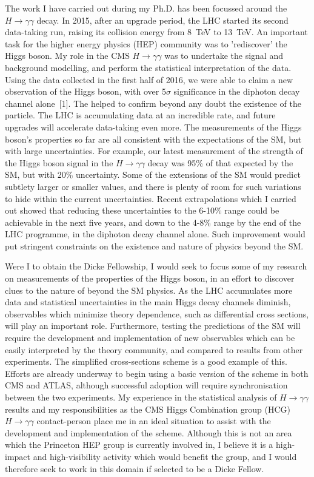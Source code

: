 \documentclass[11pt,a4paper,sans]{moderncv}        %
\begin{document}
The work I have carried out during my Ph.D. has been focussed around the $H \rightarrow \gamma \gamma$ decay. In 2015, after an upgrade period, the LHC started its second data-taking run, raising its collision energy from 8~TeV to 13~TeV. An important task for the higher energy physics (HEP) community was to 'rediscover' the Higgs boson. My role in the CMS $H \rightarrow \gamma \gamma$ was to undertake the signal and background modelling, and perform the statistical interpretation of the data. Using the data collected in the first half of 2016, we were able to claim a new observation of the Higgs boson, with over 5$\sigma$ significance in the diphoton decay channel alone~[1]. The helped to confirm beyond any doubt the existence of the particle. The LHC is accumulating data at an incredible rate, and future upgrades will accelerate data-taking even more. The measurements of the Higgs boson's properties so far are all consistent with the expectations of the SM, but with large uncertainties. For example, our latest measurement of the strength of the Higgs boson signal in the $H \rightarrow \gamma \gamma$ decay was 95\% of that expected by the SM, but with 20\% uncertainty. Some of the extensions of the SM would predict subtlety larger or smaller values, and there is plenty of room for such variations to hide within the current uncertainties. Recent extrapolations which I carried out showed that reducing these uncertainties to the 6-10\% range could be achievable in the next five years, and down to the 4-8\% range by the end of the LHC programme, in the diphoton decay channel alone. Such improvement would put stringent constraints on the existence and nature of physics beyond the SM.

Were I to obtain the Dicke Fellowship, I would seek to focus some of my research on measurements of the properties of the Higgs boson, in an effort to discover clues to the nature of beyond the SM physics. As the LHC accumulates more data and statistical uncertainties in the main Higgs decay channels diminish, observables which minimize theory dependence, such as differential cross sections, will play an important role. Furthermore, testing the predictions of the SM will require the development and implementation of new observables which can be easily interpreted by the theory community, and compared to results from other experiments. The simplified cross-sections scheme is a good example of this. Efforts are already underway to begin using a basic version of the scheme in both CMS and ATLAS, although successful adoption will require synchronisation between the two experiments. My experience in the statistical analysis of $H \rightarrow \gamma \gamma$ results and my responsibilities as the CMS Higgs Combination group (HCG)  $H \rightarrow \gamma \gamma$ contact-person place me in an ideal situation to assist with the development and implementation of the scheme. Although this is not an area which the Princeton HEP group is currently involved in, I believe it is a high-impact and high-visibility activity which would benefit the group, and I would therefore seek to work in this domain if selected to be a Dicke Fellow. 
\end{document}
